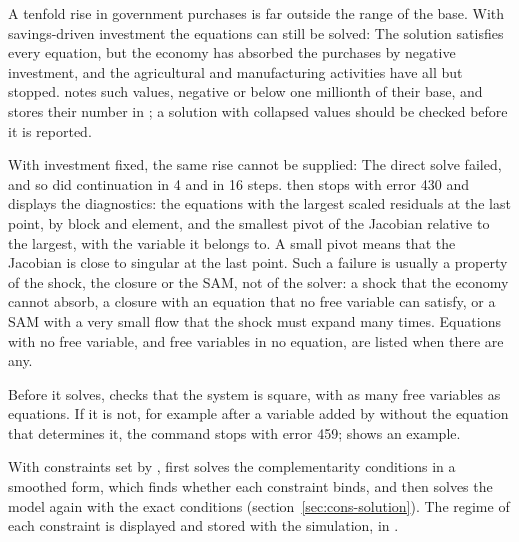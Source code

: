 A tenfold rise in government purchases is far outside the range of the base.
With savings-driven investment the equations can still be solved:
The solution satisfies every equation, but the economy has absorbed the
purchases by negative investment, and the agricultural and manufacturing
activities have all but stopped.  notes such values, negative
or below one millionth of their base, and stores their number in
; a solution with collapsed values should be checked
before it is reported.


With investment fixed, the same rise cannot be supplied:
The direct solve failed, and so did continuation in 4 and in 16 steps.
 then stops with error 430 and displays the diagnostics: the
equations with the largest scaled residuals at the last point, by block and
element, and the smallest pivot of the Jacobian relative to the largest, with
the variable it belongs to. A small pivot means that the Jacobian is close to
singular at the last point. Such a failure is usually a property of the shock, the closure or the SAM, not
of the solver: a shock that the economy cannot absorb, a closure with an
equation that no free variable can satisfy, or a SAM with a very small flow
that the shock must expand many times. Equations with no free variable, and
free variables in no equation, are listed when there are any.

Before it solves,  checks that the system is square, with as
many free variables as equations. If it is not, for example after a variable
added by  without the equation that determines it,
the command stops with error 459;  shows an example.


With constraints set by ,  first solves
the complementarity conditions in a smoothed form, which finds whether each
constraint binds, and then solves the model again with the exact conditions
(section~\ref{sec:cons-solution}). The regime of each constraint is displayed
and stored with the simulation, in .


